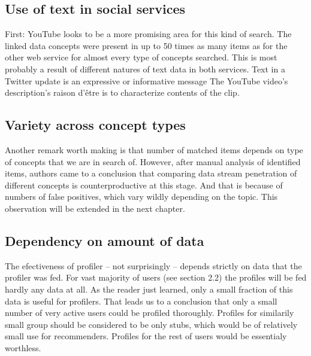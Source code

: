 \subsection{Use of text in social services}
First: YouTube looks to be a more promising area for this kind of search. The
linked data concepts were present in up to 50 times as many items as for the other
web service for almost every type of concepts searched. This is most probably a
result of different natures of text data in both services.  Text in a Twitter
update is an expressive or informative message The YouTube video's description's
raison d'être is to characterize contents of the clip.

\subsection{Variety across concept types}
Another remark worth making is that number of matched items depends on type of
concepts that we are in search of. However, after manual analysis of identified
items, authors came to a conclusion that comparing data stream penetration of
different concepts is counterproductive at this stage. And that is because of
numbers of false positives, which vary wildly depending on the topic. This
observation will be extended in the next chapter.

\subsection{Dependency on amount of data}
The efectiveness of profiler -- not surprisingly -- depends strictly on data
that the profiler was fed. For vast majority of users (see section 2.2) the
profiles will be fed hardly any data at all. As the reader just learned, only a
small fraction of this data is useful for profilers. That leads us to a
conclusion that only a small number of very active users could be profiled
thoroughly. Profiles for similarily small group should be considered to be only
stubs, which would be of relatively small use for recommenders. Profiles for the
rest of users would be essentialy worthless.
